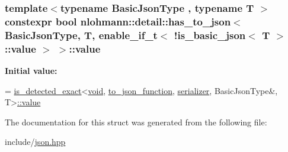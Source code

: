 \subsubsection[{\texorpdfstring{value}{value}}]{\setlength{\rightskip}{0pt plus 5cm}template$<$typename Basic\+Json\+Type , typename T $>$ constexpr bool {\bf nlohmann\+::detail\+::has\+\_\+to\+\_\+json}$<$ Basic\+Json\+Type, T, {\bf enable\+\_\+if\+\_\+t}$<$ !{\bf is\+\_\+basic\+\_\+json}$<$ T $>$\+::value $>$ $>$\+::value\hspace{0.3cm}{\ttfamily [static]}}\hypertarget{structnlohmann_1_1detail_1_1has__to__json_3_01BasicJsonType_00_01T_00_01enable__if__t_3_01_9is__4a8838c1c30336126696a126041e661c_a25600efc3dbab20cebe1a90f97505d6a}{}\label{structnlohmann_1_1detail_1_1has__to__json_3_01BasicJsonType_00_01T_00_01enable__if__t_3_01_9is__4a8838c1c30336126696a126041e661c_a25600efc3dbab20cebe1a90f97505d6a}
{\bfseries Initial value\+:}
\begin{DoxyCode}
=
        \hyperlink{namespacenlohmann_1_1detail_aa5a24092e12003ae73ae457b0dd29abd}{is\_detected\_exact}<\hyperlink{namespacenlohmann_1_1detail_a59fca69799f6b9e366710cb9043aa77d}{void}, \hyperlink{namespacenlohmann_1_1detail_af846b6cf2f926009ff3a7a61495ca383}{to\_json\_function}, 
      \hyperlink{structnlohmann_1_1detail_1_1has__to__json_3_01BasicJsonType_00_01T_00_01enable__if__t_3_01_9is__4a8838c1c30336126696a126041e661c_a7af8dd95a01e7ca32f10075c9934b107}{serializer}, BasicJsonType&,
        T>\hyperlink{structnlohmann_1_1detail_1_1has__to__json_3_01BasicJsonType_00_01T_00_01enable__if__t_3_01_9is__4a8838c1c30336126696a126041e661c_a25600efc3dbab20cebe1a90f97505d6a}{::value}
\end{DoxyCode}


The documentation for this struct was generated from the following file\+:\begin{DoxyCompactItemize}
\item 
include/\hyperlink{json_8hpp}{json.\+hpp}\end{DoxyCompactItemize}
